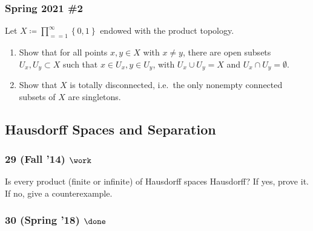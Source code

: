 \hypertarget{spring-2021-2}{%
\subsubsection{Spring 2021 \#2}\label{spring-2021-2}}

\begin{problem}[Spring 2021, 2]

Let \(X \coloneqq\prod_{==1}^{\infty} \left\{{ 0, 1 }\right\}\) endowed
with the product topology.

\begin{enumerate}
\def\labelenumi{\alph{enumi}.}
\item
  Show that for all points \(x,y\in X\) with \(x\neq y\), there are open
  subsets \(U_x, U_y \subset X\) such that \(x\in U_x, y\in U_y\), with
  \(U_x \cup U_y = X\) and \(U_x \cap U_y = \emptyset\).
\item
  Show that \(X\) is totally disconnected, i.e.~the only nonempty
  connected subsets of \(X\) are singletons.
\end{enumerate}

\end{problem}

\hypertarget{hausdorff-spaces-and-separation}{%
\subsection{Hausdorff Spaces and
Separation}\label{hausdorff-spaces-and-separation}}

\hypertarget{fall-14-work-1}{%
\subsubsection{\texorpdfstring{29 (Fall '14)
\(\work\)}{29 (Fall '14) \textbackslash work}}\label{fall-14-work-1}}

\begin{problem}[?]

Is every product (finite or infinite) of Hausdorff spaces Hausdorff? If
yes, prove it. If no, give a counterexample.

\end{problem}

\hypertarget{spring-18-done}{%
\subsubsection{\texorpdfstring{30 (Spring '18)
\(\done\)}{30 (Spring '18) \textbackslash done}}\label{spring-18-done}}

